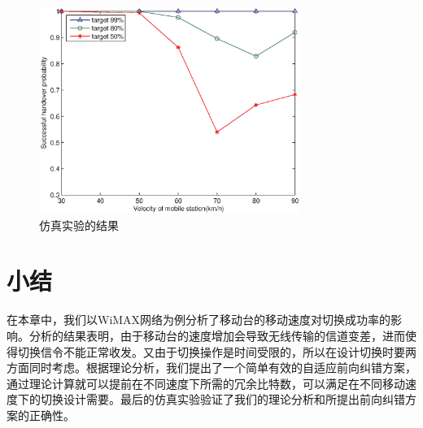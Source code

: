 \begin{figure}[t]
\begin{centering}
\includegraphics[height=6.75cm]{iccs_speed_prob_simu}
\caption{仿真实验的结果}
\label{fig:chap_iccs_results}
\end{centering}
\end{figure}

\section{小结}
在本章中，我们以WiMAX网络为例分析了移动台的移动速度对切换成功率的影响。分析的结果表明，由于移动台的速度增加会导致无线传输的信道变差，进而使得切换信令不能正常收发。又由于切换操作是时间受限的，所以在设计切换时要两方面同时考虑。根据理论分析，我们提出了一个简单有效的自适应前向纠错方案，通过理论计算就可以提前在不同速度下所需的冗余比特数，可以满足在不同移动速度下的切换设计需要。最后的仿真实验验证了我们的理论分析和所提出前向纠错方案的正确性。
